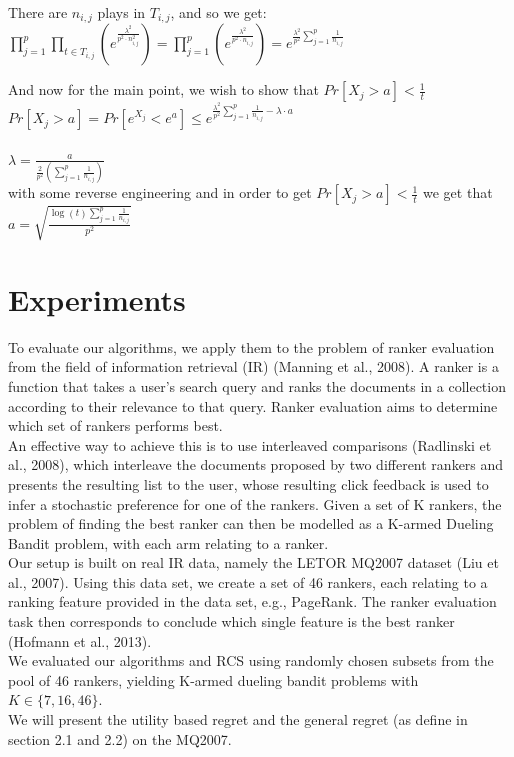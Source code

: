 \documentclass{llncs}
\begin{document}
						  There are $n_{i,j}$ plays in $T_{i,j}$, and so we get:
						  \\
						  $\prod\limits_{j=1}^{p}
						   \prod\limits_{t\in T_{i,j}}
						   \left(
						   e^{\frac{\lambda^2}{p^2\cdot n^2_{i,j}}}
						   \right) = 
						   \prod\limits_{j=1}^{p}						   
						   \left(
						   e^{\frac{\lambda^2}{p^2\cdot n_{i,j}}}
						   \right) = 
						   e^{
						   \frac{\lambda^2}{p^2}
						   \sum\limits_{j=1}^{p} \frac{1}{n_{i,j}}
						   }$
						
		And now for the main point, we wish to show that 
		$Pr[X_j > a] < \frac{1}{t}$\\
		$Pr[X_j > a] = Pr[e^{X_j} < e^a] \leq e^{
						   \frac{\lambda^2}{p^2}
						   \sum\limits_{j=1}^{p} \frac{1}{n_{i,j}}
						   - \lambda\cdot a}$
		\\
		\\
		$\lambda = \frac{a}{\frac{2}{p^2}\left( \sum\limits_{j=1}^{p} \frac{1}{n_{i,j}} \right)} $ 
		\\
		with some reverse engineering and in order to get $Pr[X_j > a] < \frac{1}{t}$ we get that $a = \sqrt{\frac{\log(t) \sum\limits_{j=1}^{p} \frac{1}{n_{i,j}}}{p^2}}$ 
 
 
	
		
\section{Experiments}

To evaluate our algorithms, we apply them to the problem of
ranker evaluation from the field of information retrieval
(IR) (Manning et al., 2008). A ranker is a
function that takes a user's search query and
ranks the documents in a collection according to their
relevance to that query. Ranker evaluation aims to determine
which set of rankers performs best.
\\
An effective way to achieve this is to use interleaved
comparisons (Radlinski et al., 2008), which interleave
the documents proposed by two different rankers and
presents the resulting list to the user, whose resulting
click feedback is used to infer a stochastic preference
for one of the rankers. Given a set of K rankers, the
problem of finding the best ranker can then be modelled 
as a K-armed Dueling Bandit problem, with each
arm relating to a ranker.
\\
Our setup is built on real IR data,
namely the LETOR MQ2007 dataset (Liu et al., 2007).
Using this data set, we create a set of 46 rankers, each
relating to a ranking feature provided in the
data set, e.g., PageRank. The ranker evaluation task
then corresponds to conclude which single feature
is the best ranker (Hofmann et al., 2013).
\\
We evaluated our algorithms and RCS
using randomly chosen subsets from the pool of 46
rankers, yielding K-armed dueling bandit problems
with $K\in \{7, 16, 46\}$. 
\\
We will present the utility based regret and the general regret (as define in section 2.1 and 2.2) on the MQ2007. 
\newpage
\end{document}
